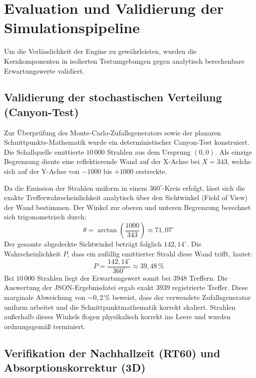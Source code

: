 \documentclass{article}
\begin{document}
    \section{Evaluation und Validierung der Simulationspipeline}
    \label{sec:evaluation}

    Um die Verlässlichkeit der Engine zu gewährleisten, wurden die Kernkomponenten in isolierten Testumgebungen gegen analytisch berechenbare Erwartungswerte validiert.

    \subsection{Validierung der stochastischen Verteilung (Canyon-Test)}
    \label{subsec:eval_montecarlo}

    Zur Überprüfung des Monte-Carlo-Zufallsgenerators sowie der planaren Schnittpunkts-Mathematik wurde ein deterministischer Canyon-Test konstruiert.
    Die Schallquelle emittierte $10\,000$ Strahlen aus dem Ursprung $(0,0)$.
    Als einzige Begrenzung diente eine reflektierende Wand auf der X-Achse bei $X = 343$, welche sich auf der Y-Achse von $-1000$ bis $+1000$ erstreckte.

    Da die Emission der Strahlen uniform in einem $360^\circ$-Kreis erfolgt, lässt sich die exakte Trefferwahrscheinlichkeit analytisch über den Sichtwinkel (Field of View) der Wand bestimmen.
    Der Winkel zur oberen und unteren Begrenzung berechnet sich trigonometrisch durch:
    \[ \theta = \arctan\left(\frac{1000}{343}\right) \approx 71{,}07^\circ \]
    Der gesamte abgedeckte Sichtwinkel beträgt folglich $142{,}14^\circ$.
    Die Wahrscheinlichkeit $P$, dass ein zufällig emittierter Strahl diese Wand trifft, lautet:
    \[ P = \frac{142{,}14^\circ}{360^\circ} \approx 39{,}48\,\% \]
    Bei $10\,000$ Strahlen liegt der Erwartungswert somit bei $3948$ Treffern.
    Die Auswertung der JSON-Ergebnisdatei ergab exakt $3939$ registrierte Treffer.
    Diese marginale Abweichung von $\sim 0{,}2\,\%$ beweist, dass der verwendete Zufallsgenerator uniform arbeitet und die Schnittpunktmathematik korrekt skaliert.
    Strahlen außerhalb dieses Winkels flogen physikalisch korrekt ins Leere und wurden ordnungsgemäß terminiert.



    \subsection{Verifikation der Nachhallzeit (RT60) und Absorptionskorrektur (3D)}
    \label{subsec:eval_rt60}
\end{document}
